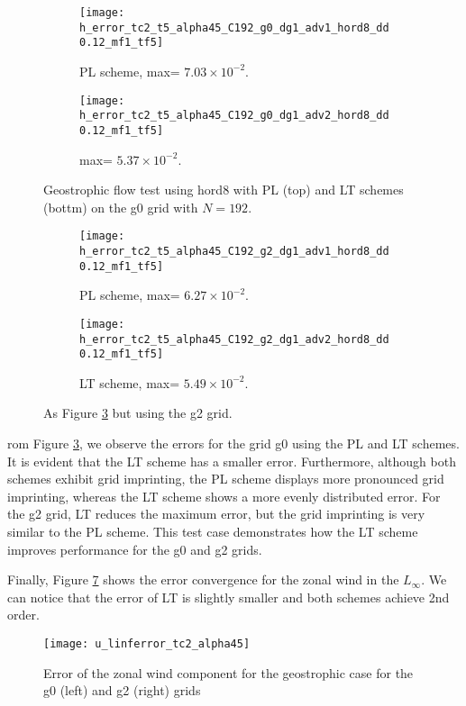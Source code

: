 \begin{figure}[!h]
	\centering
	\begin{subfigure}{0.6\textwidth}
		\centering
		\texttt{[image: h\_error\_tc2\_t5\_alpha45\_C192\_g0\_dg1\_adv1\_hord8\_dd0.12\_mf1\_tf5]}
		\caption{PL scheme, max= $7.03\times10^{-2}$.\label{chp-advcs-sec-exp-sw1-errors-0a}}
	\end{subfigure}
	\begin{subfigure}{0.6\textwidth}
		\centering
		\texttt{[image: h\_error\_tc2\_t5\_alpha45\_C192\_g0\_dg1\_adv2\_hord8\_dd0.12\_mf1\_tf5]}
		\caption{ max= $5.37\times10^{-2}$.\label{chp-advcs-sec-exp-sw1-errors-0b}}
	\end{subfigure}
	\caption{
		Geostrophic flow test using hord8
		with PL (top) and LT schemes (bottm) on the g0 grid with $N=192$. 
		\label{chp-advcs-sec-exp-sw1-errors-0}}
\end{figure}
\newpage
\begin{figure}[!h]
	\centering
	\begin{subfigure}{0.6\textwidth}
		\centering
		\texttt{[image: h\_error\_tc2\_t5\_alpha45\_C192\_g2\_dg1\_adv1\_hord8\_dd0.12\_mf1\_tf5]}
		\caption{PL scheme,  max= $6.27\times10^{-2}$.\label{chp-advcs-sec-exp-sw1-errors-2a}}
	\end{subfigure}
	\begin{subfigure}{0.6\textwidth}
		\centering
		\texttt{[image: h\_error\_tc2\_t5\_alpha45\_C192\_g2\_dg1\_adv2\_hord8\_dd0.12\_mf1\_tf5]}
		\caption{LT scheme, max= $5.49\times10^{-2}$.\label{chp-advcs-sec-exp-sw1-errors-2b}}
	\end{subfigure}
	\caption{As Figure \ref{chp-advcs-sec-exp-sw1-errors-0} but using the g2 grid.\label{chp-advcs-sec-exp-sw1-errors-2}}
\end{figure}

rom Figure \ref{chp-advcs-sec-exp-sw1-errors-0}, we observe the errors for the grid g0 using the PL and LT schemes. It is evident that the LT scheme has a smaller error. Furthermore, although both schemes exhibit grid imprinting, the PL scheme displays more pronounced grid imprinting, whereas the LT scheme shows a more evenly distributed error.
For the g2 grid, LT reduces the maximum error, but the grid imprinting is very similar to the PL scheme.
This test case demonstrates how the LT scheme improves performance for the g0 and g2 grids.

Finally, Figure \ref{chp-advcs-sec-exp-sw-l2} shows the error convergence for the zonal wind in the $L_{\infty}$. 
We can notice that the error of LT is slightly smaller and both schemes achieve 2nd order.
\newpage
\begin{figure}[!htb]
	\centering
	\texttt{[image: u\_linferror\_tc2\_alpha45]}
	\caption{Error of the zonal wind component for the geostrophic case for the g0 (left) and g2 (right) grids \label{chp-advcs-sec-exp-sw-l2}}
\end{figure}

